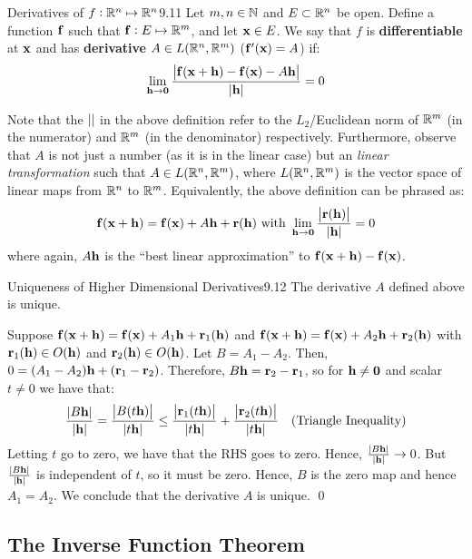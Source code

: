 \begin{definition}{Derivatives of $f: \mathbb{R}^n \mapsto \mathbb{R}^n$}{9.11}
    Let $m, n \in \mathbb{N}$ and $E \subset \mathbb{R}^n$ be open. Define a function $\mathbf{f}$ such that $\mathbf{f}: E \mapsto \mathbb{R}^m$, and let $\mathbf{x} \in E$. We say that $f$ is \textbf{differentiable} at $\mathbf{x}$ and has \textbf{derivative} $A \in L(\mathbb{R}^n, \mathbb{R}^m)$ ($\mathbf{f}'(\mathbf{x}) = A$) if:
    \begin{align*}
        \lim_{\mathbf{h} \rightarrow \mathbf{0}} \frac{\abs{\mathbf{f}(\mathbf{x} + \mathbf{h}) - \mathbf{f}(\mathbf{x}) - A\mathbf{h}}}{\abs{\mathbf{h}}} = 0
    \end{align*}
\end{definition}
\noindent Note that the $\abs{}$ in the above definition refer to the $L_2$/Euclidean norm of $\mathbb{R}^m$ (in the numerator) and $\mathbb{R}^m$ (in the denominator) respectively. Furthermore, observe that $A$ is not just a number (as it is in the linear case) but an \emph{linear transformation} such that $A \in L(\mathbb{R}^n, \mathbb{R}^m)$, where $L(\mathbb{R}^n, \mathbb{R}^m)$ is the vector space of linear maps from $\mathbb{R}^n$ to $\mathbb{R}^m$. Equivalently, the above definition can be phrased as:
\begin{align*}
    \mathbf{f}(\mathbf{x} + \mathbf{h}) = \mathbf{f}(\mathbf{x}) + A\mathbf{h} + \mathbf{r}(\mathbf{h}) \text{ with } \lim_{\mathbf{h} \rightarrow \mathbf{0}} \frac{\abs{\mathbf{r}(\mathbf{h})}}{\abs{\mathbf{h}}} = 0
\end{align*}
where again, $A\mathbf{h}$ is the ``best linear approximation'' to $\mathbf{f}(\mathbf{x} + \mathbf{h}) - \mathbf{f}(\mathbf{x})$. 

\begin{theorem}{Uniqueness of Higher Dimensional Derivatives}{9.12}
    The derivative $A$ defined above is unique.
\end{theorem}
\begin{nproof}
    Suppose $\mathbf{f}(\mathbf{x} + \mathbf{h}) = \mathbf{f}(\mathbf{x}) + A_1\mathbf{h} + \mathbf{r}_1(\mathbf{h})$ and $\mathbf{f}(\mathbf{x} + \mathbf{h}) = \mathbf{f}(\mathbf{x}) + A_2\mathbf{h} + \mathbf{r}_2(\mathbf{h})$ with $\mathbf{r}_1(\mathbf{h}) \in O(\mathbf{h})$ and $\mathbf{r}_2(\mathbf{h}) \in O(\mathbf{h})$. Let $B = A_1 - A_2$. Then, $0 = (A_1 - A_2)\mathbf{h} + (\mathbf{r}_1 - \mathbf{r}_2)$. Therefore, $B\mathbf{h} = \mathbf{r}_2 - \mathbf{r}_1$, so for $\mathbf{h} \neq \mathbf{0}$ and scalar $t \neq 0$ we have that:
    \begin{align*}
        \frac{\abs{B\mathbf{h}}}{\abs{\mathbf{h}}} = \frac{\abs{B(t\mathbf{h})}}{\abs{t\mathbf{h}}} \leq \frac{\abs{\mathbf{r}_1(t\mathbf{h})}}{\abs{t\mathbf{h}}} + \frac{\abs{\mathbf{r}_2(t\mathbf{h})}}{\abs{t\mathbf{h}}} \quad \text{(Triangle Inequality)}
    \end{align*} 
    Letting $t$ go to zero, we have that the RHS goes to zero. Hence, $\frac{\abs{B\mathbf{h}}}{\abs{\mathbf{h}}} \rightarrow 0$. But $\frac{\abs{B\mathbf{h}}}{\abs{\mathbf{h}}}$ is independent of $t$, so it must be zero. Hence, $B$ is the zero map and hence $A_1 = A_2$. We conclude that the derivative $A$ is unique. \qed
\end{nproof}


\subsection{The Inverse Function Theorem}


